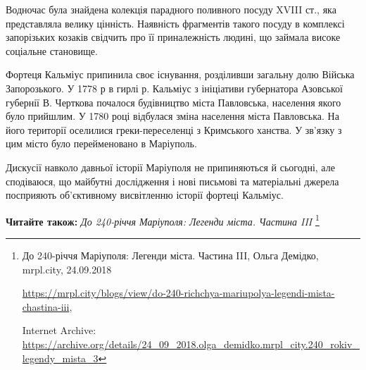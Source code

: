 Водночас була знайдена колекція парадного поливного посуду XVIII ст., яка
представляла велику цінність. Наявність фрагментів такого посуду в комплексі
запорізьких козаків свідчить про її приналежність людині, що займала високе
соціальне становище.

Фортеця Кальміус припинила своє існування, розділивши загальну долю Війська
Запорозького. У 1778 р в гирлі р. Кальміус з ініціативи губернатора Азовської
губернії В. Черткова почалося будівництво міста Павловська, населення якого
було прийшлим. У 1780 році відбулася зміна населення міста Павловська. На його
території оселилися греки-переселенці з Кримського ханства. У зв'язку з цим
місто було перейменовано в Маріуполь.

Дискусії навколо давньої історії Маріуполя не припиняються й сьогодні, але
сподіваюся, що майбутні дослідження і нові письмові та матеріальні джерела
посприяють об'єктивному висвітленню історії фортеці Кальміус.

\textbf{Читайте також:} \emph{До 240-річчя Маріуполя: Легенди міста. Частина III}%
\footnote{До 240-річчя Маріуполя: Легенди міста. Частина III, Ольга Демідко, mrpl.city, 24.09.2018 \par
\url{https://mrpl.city/blogs/view/do-240-richchya-mariupolya-legendi-mista-chastina-iii},\par
Internet Archive: \url{https://archive.org/details/24_09_2018.olga_demidko.mrpl_city.240_rokiv_legendy_mista_3}%
}
